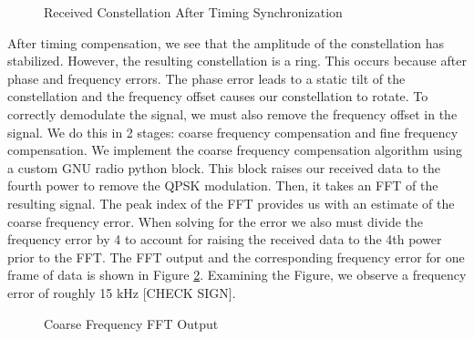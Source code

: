 \documentclass[conference,onecolumn]{IEEEtran}
\begin{document}
\begin{figure}[H]
	\centerline{}
	\caption{Received Constellation After Timing Synchronization}
	\label{fig::constellation_after_timing_comp}
\end{figure}

After timing compensation, we see that the amplitude of the constellation has stabilized. However, the resulting constellation is a ring. This occurs because after phase and frequency errors. The phase error leads to a static tilt of the constellation and the frequency offset causes our constellation to rotate. To correctly demodulate the signal, we must also remove the frequency offset in the signal. We do this in 2 stages: coarse frequency compensation and fine frequency compensation. We implement the coarse frequency compensation algorithm using a custom GNU radio python block. This block raises our received data to the fourth power to remove the QPSK modulation. Then, it takes an FFT of the resulting signal. The peak index of the FFT provides us with an estimate of the coarse frequency error. When solving for the error we also must divide the frequency error by 4 to account for raising the received data to the 4th power prior to the FFT. The FFT output and the corresponding frequency error for one frame of data is shown in Figure \ref{fig::cfo_frequency_estimate}. Examining the Figure, we observe a frequency error of roughly 15 kHz [CHECK SIGN].

\begin{figure}[H]
	\centerline{}
	\caption{Coarse Frequency FFT Output}
	\label{fig::cfo_frequency_estimate}
\end{figure}
\end{document}
